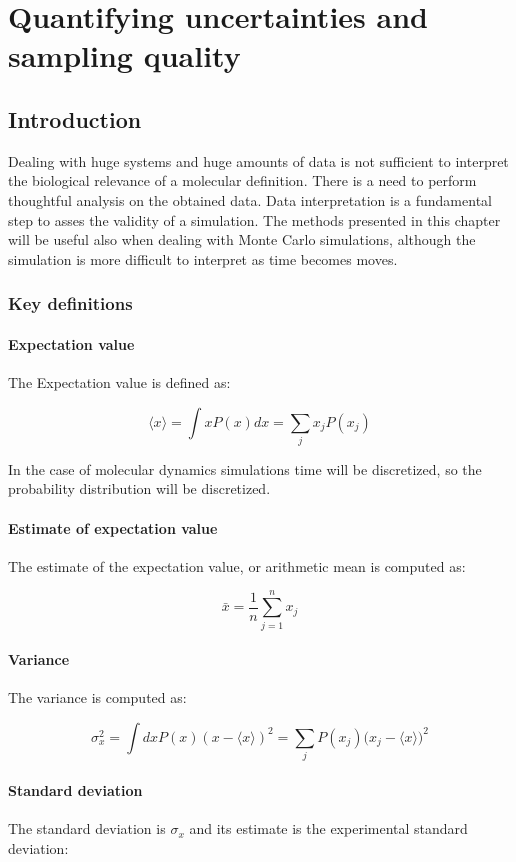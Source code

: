 \graphicspath{{chapters/14/images/}}
\chapter{Quantifying uncertainties and sampling quality}

\section{Introduction}
Dealing with huge systems and huge amounts of data is not sufficient to interpret the biological relevance of a molecular definition.
There is a need to perform thoughtful analysis on the obtained data.
Data interpretation is a fundamental step to asses the validity of a simulation.
The methods presented in this chapter will be useful also when dealing with Monte Carlo simulations, although the simulation is more difficult to interpret as time becomes moves.

	\subsection{Key definitions}

		\subsubsection{Expectation value}
		The Expectation value is defined as:

		$$\langle x\rangle = \int xP(x)dx = \sum\limits_jx_jP(x_j)$$

		In the case of molecular dynamics simulations time will be discretized, so the probability distribution will be discretized.

		\subsubsection{Estimate of expectation value}
		The estimate of the expectation value, or arithmetic mean is computed as:

		$$\bar{x} = \frac{1}{n}\sum\limits_{j=1}^nx_j$$

		\subsubsection{Variance}
		The variance is computed as:

		$$\sigma^2_x = \int dxP(x)(x-\langle x\rangle)^2 = \sum\limits_{j}P(x_j)\bigl(x_j-\langle x\rangle\bigr)^2$$

		\subsubsection{Standard deviation}
		The standard deviation is $\sigma_x$ and its estimate is the experimental standard deviation:

